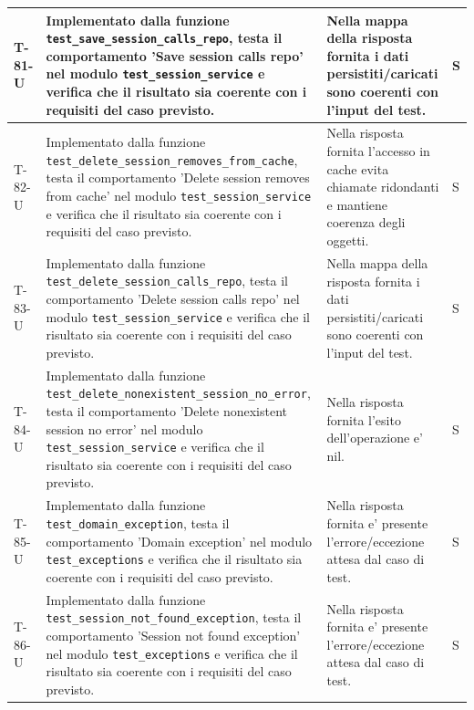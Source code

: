 \documentclass[a4paper,12pt]{article}
\begin{document}
{{\begin{longtable}{|>{\RaggedRight\arraybackslash}p{1.55cm}|>{\RaggedRight\arraybackslash}p{8.0cm}|>{\RaggedRight\arraybackslash}p{4.6cm}|>{\RaggedRight\arraybackslash}p{1.2cm}|}
        \hline
        T-81-U & Implementato dalla funzione \texttt{test\_\allowbreak save\_\allowbreak session\_\allowbreak calls\_\allowbreak repo}, testa il comportamento 'Save session calls repo' nel modulo \texttt{test\_\allowbreak session\_\allowbreak service} e verifica che il risultato sia coerente con i requisiti del caso previsto. & Nella mappa della risposta fornita i dati persistiti/caricati sono coerenti con l'input del test. & S \\
        \hline
        T-82-U & Implementato dalla funzione \texttt{test\_\allowbreak delete\_\allowbreak session\_\allowbreak removes\_\allowbreak from\_\allowbreak cache}, testa il comportamento 'Delete session removes from cache' nel modulo \texttt{test\_\allowbreak session\_\allowbreak service} e verifica che il risultato sia coerente con i requisiti del caso previsto. & Nella risposta fornita l'accesso in cache evita chiamate ridondanti e mantiene coerenza degli oggetti. & S \\
        \hline
        T-83-U & Implementato dalla funzione \texttt{test\_\allowbreak delete\_\allowbreak session\_\allowbreak calls\_\allowbreak repo}, testa il comportamento 'Delete session calls repo' nel modulo \texttt{test\_\allowbreak session\_\allowbreak service} e verifica che il risultato sia coerente con i requisiti del caso previsto. & Nella mappa della risposta fornita i dati persistiti/caricati sono coerenti con l'input del test. & S \\
        \hline
        T-84-U & Implementato dalla funzione \texttt{test\_\allowbreak delete\_\allowbreak nonexistent\_\allowbreak session\_\allowbreak no\_\allowbreak error}, testa il comportamento 'Delete nonexistent session no error' nel modulo \texttt{test\_\allowbreak session\_\allowbreak service} e verifica che il risultato sia coerente con i requisiti del caso previsto. & Nella risposta fornita l'esito dell'operazione e' nil. & S \\
        \hline
        T-85-U & Implementato dalla funzione \texttt{test\_\allowbreak domain\_\allowbreak exception}, testa il comportamento 'Domain exception' nel modulo \texttt{test\_\allowbreak exceptions} e verifica che il risultato sia coerente con i requisiti del caso previsto. & Nella risposta fornita e' presente l'errore/eccezione attesa dal caso di test. & S \\
        \hline
        T-86-U & Implementato dalla funzione \texttt{test\_\allowbreak session\_\allowbreak not\_\allowbreak found\_\allowbreak exception}, testa il comportamento 'Session not found exception' nel modulo \texttt{test\_\allowbreak exceptions} e verifica che il risultato sia coerente con i requisiti del caso previsto. & Nella risposta fornita e' presente l'errore/eccezione attesa dal caso di test. & S \\

\end{longtable}}}
\end{document}
